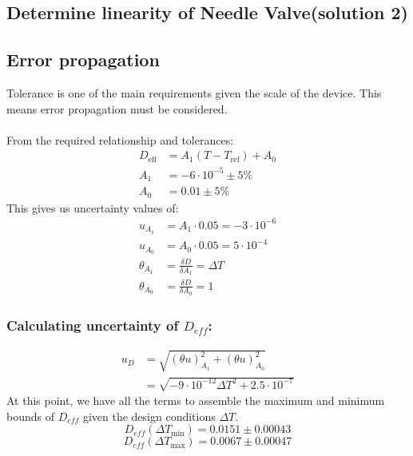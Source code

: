 \documentclass[11pt]{article}
\begin{document}
\subsection{Determine linearity of Needle Valve(solution 2)}

\newpage
\subsection{Error propagation}
Tolerance is one of the main requirements given the scale of the device. This means error propagation must be considered.
\\~\\
From the required relationship and tolerances: 
\begin{align*}
    D_{\text{eff}} &= A_1(T-T_{\text{ref}})+A_0
    \\
    A_1 &= -6\cdot10^{-5}\pm 5\%
    \\
    A_0 &= 0.01 \pm 5\%
\end{align*}
This gives us uncertainty values of:
\begin{align*}
    u_{A_1} &= A_1 \cdot 0.05 = -3 \cdot 10^{-6}
    \\
    u_{A_0} &= A_0 \cdot 0.05 = 5 \cdot 10^{-4}
    \\
    \theta_{A_1} &= \frac{\delta D}{\delta A_1} = \Delta T
    \\
    \theta_{A_0} &= \frac{\delta D}{\delta A_0} = 1
\end{align*}
\subsubsection{Calculating uncertainty of $D_{eff}$:}
\begin{align*}
    u_{D} &= \sqrt{(\theta u)_{A_1}^2+(\theta u)_{A_0}^2}
    \\
    &= \sqrt{-9\cdot10^{-12}\Delta T^2 + 2.5\cdot10^{-7}}
\end{align*}
At this point, we have all the terms to assemble the maximum and minimum bounds of $D_{eff}$ given the design conditions $\Delta T$.
$$D_{eff}(\Delta T_{\text{min}}) = 0.0151\pm 0.00043$$
$$D_{eff}(\Delta T_{\text{max}}) = 0.0067\pm 0.00047$$
\newpage
\end{document}
